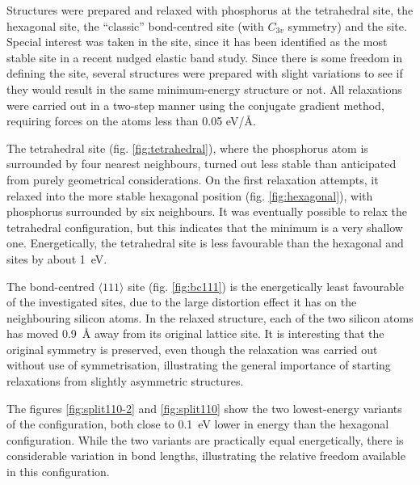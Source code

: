 \documentclass[11pt,bibliography=totoc,index=totoc]{scrbook}   %
\begin{document}
Structures were prepared and relaxed with phosphorus at the tetrahedral site, the hexagonal site, 
the ``classic'' bond-centred site (with $C_{3v}$ symmetry) and the  site.
Special interest was taken in the  site, since it has been identified as the most stable site 
in a recent nudged elastic band study.\cite{Liu:2003}
Since there is some freedom in defining the site, several structures were prepared with slight variations 
to see if they would result in the same minimum-energy structure or not.
All relaxations were carried out in a two-step manner using the conjugate gradient method, 
requiring forces on the atoms less than 0.05 eV/Å.

The tetrahedral site (fig. \ref{fig:tetrahedral}), where the phosphorus atom is surrounded by four nearest neighbours, 
turned out less stable than anticipated from purely geometrical considerations.
On the first relaxation attempts, it relaxed into the more stable hexagonal position (fig. \ref{fig:hexagonal}), with
phosphorus surrounded by six neighbours.
It was eventually possible to relax the tetrahedral configuration, but this indicates that the minimum is a very shallow one.
Energetically, the tetrahedral site is less favourable than the hexagonal and  sites by about 1~eV.

The bond-centred $\langle 111 \rangle$ site (fig. \ref{fig:bc111}) is the energetically least favourable of the investigated sites,
due to the large distortion effect it has on the neighbouring silicon atoms. 
In the relaxed structure, each of the two silicon atoms has moved 0.9~Å away from its original lattice site.
It is interesting that the original symmetry is preserved, even though the relaxation was carried out without use of symmetrisation,
illustrating the general importance of starting relaxations from slightly asymmetric structures.

The figures \ref{fig:split110-2} and \ref{fig:split110} show the two lowest-energy variants of the  configuration,
both close to 0.1~eV lower in energy than the hexagonal configuration.
While the two variants are practically equal energetically, 
there is considerable variation in bond lengths, illustrating
the relative freedom available in this configuration.
\end{document}
